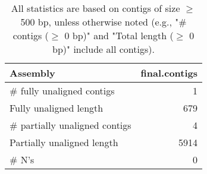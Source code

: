 \documentclass[12pt,a4paper]{article}
\begin{document}
\begin{table}[ht]
\begin{center}
\caption{All statistics are based on contigs of size $\geq$ 500 bp, unless otherwise noted (e.g., "\# contigs ($\geq$ 0 bp)" and "Total length ($\geq$ 0 bp)" include all contigs).}
\begin{tabular}{|l*{1}{|r}|}
\hline
Assembly & final.contigs \\ \hline
\# fully unaligned contigs & 1 \\ \hline
Fully unaligned length & 679 \\ \hline
\# partially unaligned contigs & 4 \\ \hline
Partially unaligned length & 5914 \\ \hline
\# N's & 0 \\ \hline
\end{tabular}
\end{center}
\end{table}
\end{document}
